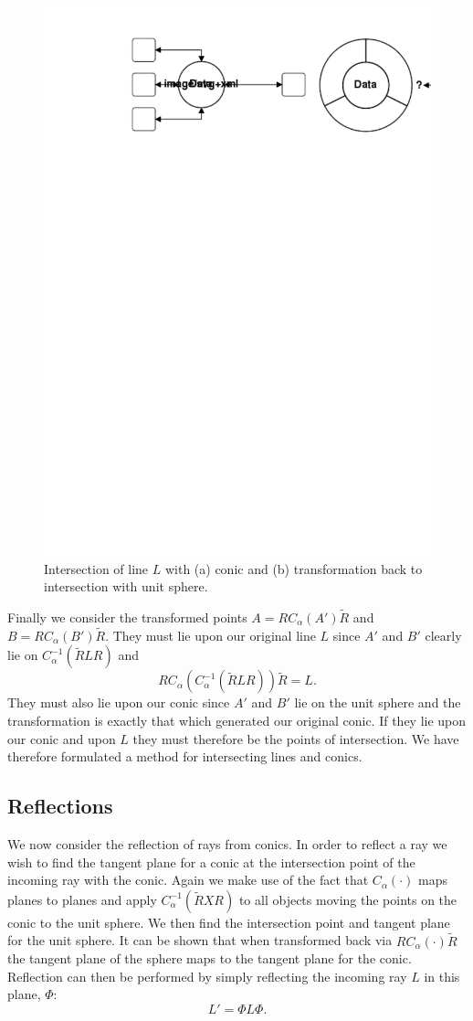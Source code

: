 \begin{figure}[t]\centering
\includegraphics[width=0.8\columnwidth]{objcobject}
\caption{\label{fig:conic_transform}Intersection of line $L$ with 
  (a) conic and (b) transformation back to intersection with unit sphere.}
\end{figure}

Finally we consider the transformed points $A = RC_\alpha(A')\tilde{R}$
and
$B = RC_\alpha(B')\tilde{R}$. They must lie upon our original line 
$L$ since
$A'$ and $B'$ clearly lie on $C_\alpha^{-1}(\tilde{R}LR)$ and 
\[ RC_\alpha(C_\alpha^{-1}(\tilde{R}LR))\tilde{R} = L. \]
They must also lie upon our conic since $A'$ and $B'$ lie on the unit sphere
and the transformation is exactly that which generated our original conic.
If they lie upon our conic and upon $L$ they must therefore be the points
of intersection.
We have therefore formulated a method for intersecting lines and conics. 

\subsection{Reflections}
\label{sec:Ref}
We now consider the reflection of rays from conics. In order to
reflect a ray we wish to find the tangent plane for a conic at the 
intersection point of the incoming ray with the conic. Again we
make use of the fact that $C_\alpha(\cdot)$ maps planes to
planes and apply $C_\alpha^{-1}(\tilde{R}XR)$ to all objects moving the
points on the conic to the unit sphere. We then find the intersection
point and tangent plane for the unit sphere. It can be shown \cite{jic23fyr}
that when transformed back via $RC_\alpha(\cdot)\tilde{R}$ the tangent
plane of the sphere maps to the tangent plane for the conic. Reflection
can then be performed by simply reflecting the incoming ray $L$ in
this plane, $\Phi$:
\[
L' = \Phi L \Phi.
\]
